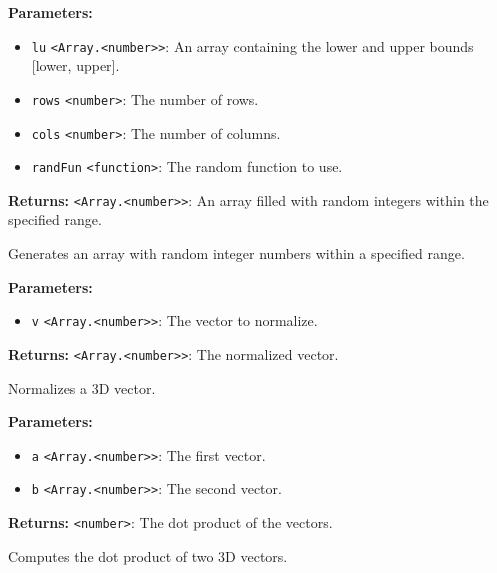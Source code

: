 \documentclass[12pt,a4paper]{article}
\begin{document}
\noindent \textbf{Parameters:}
\begin{itemize}
  \item \texttt{lu} \texttt{<Array.<number>>}: An array containing the lower and upper bounds [lower, upper].
  \item \texttt{rows} \texttt{<number>}: The number of rows.
  \item \texttt{cols} \texttt{<number>}: The number of columns.
  \item \texttt{randFun} \texttt{<function>}: The random function to use.
\end{itemize}

\noindent \textbf{Returns:} \texttt{<Array.<number>>}: An array filled with random integers within the specified range.

\noindent Generates an array with random integer numbers within a specified range.

\vspace{5mm}
\noindent {}


\noindent \textbf{Parameters:}
\begin{itemize}
  \item \texttt{v} \texttt{<Array.<number>>}: The vector to normalize.
\end{itemize}

\noindent \textbf{Returns:} \texttt{<Array.<number>>}: The normalized vector.

\noindent Normalizes a 3D vector.

\vspace{5mm}
\noindent {}


\noindent \textbf{Parameters:}
\begin{itemize}
  \item \texttt{a} \texttt{<Array.<number>>}: The first vector.
  \item \texttt{b} \texttt{<Array.<number>>}: The second vector.
\end{itemize}

\noindent \textbf{Returns:} \texttt{<number>}: The dot product of the vectors.

\noindent Computes the dot product of two 3D vectors.

\vspace{5mm}
\noindent {}
\end{document}
